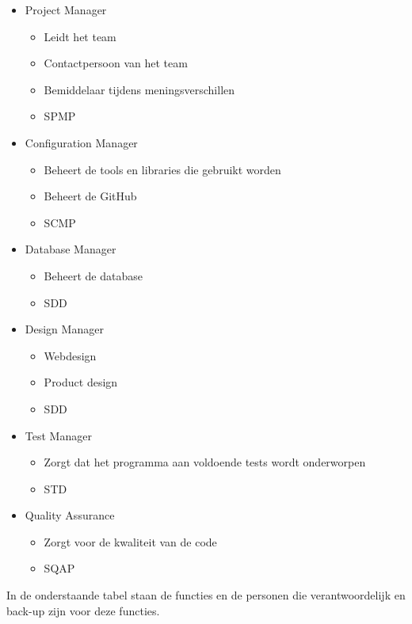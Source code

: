 \begin{itemize}
\item Project Manager
\begin{itemize}
\item Leidt het team
\item Contactpersoon van het team
\item Bemiddelaar tijdens meningsverschillen
\item SPMP
\end{itemize}

\item Configuration Manager
\begin{itemize}
\item Beheert de tools en libraries die gebruikt worden
\item Beheert de GitHub
\item SCMP
\end{itemize}

\item Database Manager
\begin{itemize}
\item Beheert de database
\item SDD
\end{itemize}

\item Design Manager
\begin{itemize}
\item Webdesign
\item Product design
\item SDD
\end{itemize}

\item Test Manager
\begin{itemize}
\item Zorgt dat het programma aan voldoende tests wordt onderworpen
\item STD
\end{itemize}

\item Quality Assurance
 \begin{itemize}
 \item Zorgt voor de kwaliteit van de code
 \item SQAP
 \end{itemize}
 \end{itemize}
 
 \newpage

In de onderstaande tabel staan de functies en de personen die verantwoordelijk en back-up zijn voor deze functies.

